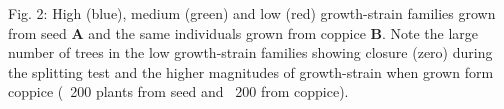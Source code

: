 Fig. 2: High (blue), medium (green) and low (red) growth-strain families grown from seed \textbf{A} and the same individuals grown from coppice \textbf{B}. Note the large number of trees in the low growth-strain families showing closure (zero) during the splitting test and the higher magnitudes of growth-strain when grown form coppice (~200 plants from seed and ~200 from coppice).